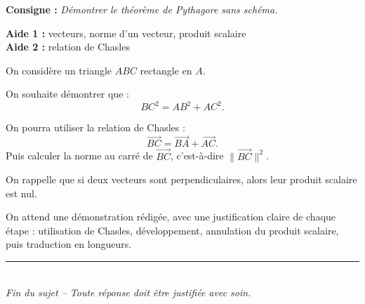 \documentclass[11pt,a4paper]{article}
\begin{document}
\textbf{Consigne :} \emph{Démontrer le théorème de Pythagore sans schéma.}

\medskip

\textbf{Aide 1 :} vecteurs, norme d'un vecteur, produit scalaire\\
\textbf{Aide 2 :} relation de Chasles

\medskip

On considère un triangle \(ABC\) rectangle en \(A\).

On souhaite démontrer que :
\[
BC^2=AB^2+AC^2.
\]

\begin{tcolorbox}[title=Indications]
On pourra utiliser la relation de Chasles :
\[
\overrightarrow{BC}=\overrightarrow{BA}+\overrightarrow{AC}.
\]
Puis calculer la norme au carré de \(\overrightarrow{BC}\), c'est-à-dire \(\|\overrightarrow{BC}\|^2\).

On rappelle que si deux vecteurs sont perpendiculaires, alors leur produit scalaire est nul.
\end{tcolorbox}



\begin{tcolorbox}[title=Attendus]
On attend une démonstration rédigée, avec une justification claire de chaque étape : utilisation de Chasles, développement, annulation du produit scalaire, puis traduction en longueurs.
\end{tcolorbox}

\vspace{0.6em}


\vfill

\begin{center}
    \rule{0.8\textwidth}{0.6pt}\\[0.4em]
    \textit{Fin du sujet -- Toute réponse doit être justifiée avec soin.}
\end{center}
\end{document}
